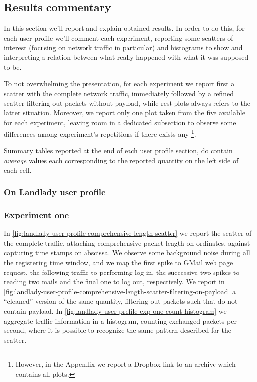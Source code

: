 \documentclass[10pt,a4paper]{article}
\begin{document}
    \newpage

    \subsection{Results commentary}

    In this section we'll report and explain obtained results. In
    order to do this, for each user profile we'll comment each
    experiment, reporting some scatters of interest (focusing on
    network traffic in particular) and histograms to show and
    interpreting a relation between what really happened with what it
    was supposed to be. 

    To not overwhelming the presentation, for each experiment we
    report first a scatter with the complete network traffic,
    immediately followed by a refined scatter filtering out packets
    without payload, while rest plots always refers to the latter
    situation. Moreover, we report only one plot taken from the five
    available for each experiment, leaving room in a dedicated
    subsection to observe some differences among experiment's
    repetitions if there exists any \footnote{However, in the Appendix
      we report a Dropbox link to an archive which contains all
      plots.}.

    Summary tables reported at the end of each user profile section,
    do contain \emph{average} values each corresponding to the
    reported quantity on the left side of each cell.

    \subsubsection{On Landlady user profile}

    \subsubsection*{Experiment one}
    In
    \autoref{fig:landlady-user-profile-comprehensive-length-scatter}
    we report the scatter of the complete traffic, attaching
    comprehensive packet length on ordinates, against capturing
    time stamps on abscissa. We observe some background noise during
    all the registering time window, and we map the first spike to
    GMail web page request, the following traffic to performing log in,
    the successive two spikes to reading two mails and the final one
    to log out, respectively. We report in
    \autoref{fig:landlady-user-profile-comprehensive-length-scatter-filtering-on-payload}
    a ``cleaned'' version of the same quantity, filtering out packets
    such that do not contain payload. In
    \autoref{fig:landlady-user-profile-exp-one-count-histogram} we
    aggregate traffic information in a histogram, counting exchanged
    packets per second, where it is possible to recognize the same
    pattern described for the scatter.
\end{document}
